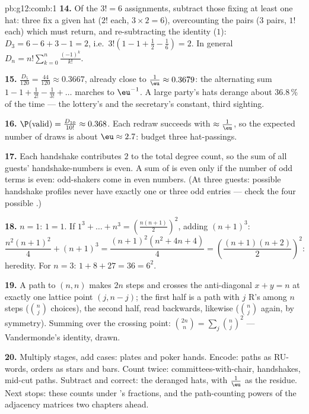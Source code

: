 \begin{solution}{pb:g12:comb:1}
\textbf{14.} Of the $3! = 6$ assignments, subtract those
fixing at least one hat: three fix a given hat ($2!$ each,
$3 \times 2 = 6$), overcounting the pairs ($3$ pairs, $1!$
each) which must return, and re-subtracting the identity
($1$): $D_3 = 6 - 6 + 3 - 1 = 2$, i.e.\
$3!\left(1 - 1 + \frac12 - \frac16\right) = 2$. In general
$D_n = n!\sum_{k=0}^{n} \frac{(-1)^k}{k!}$.

\textbf{15.} $\frac{D_5}{120} = \frac{44}{120} \approx
0.3667$, already close to $\frac1\eu \approx 0.3679$: the
alternating sum $1 - 1 + \frac{1}{2!} - \frac{1}{3!} + \dots$
marches to $\eu^{-1}$. A large party's hats derange about
$36.8\,\%$ of the time --- the lottery's and the secretary's
constant, third sighting.

\textbf{16.} $\P(\text{valid}) = \frac{D_{10}}{10!} \approx
0.368$. Each redraw succeeds with 
$\approx \frac1\eu$, so the expected number of draws is about
$\eu \approx 2.7$: budget three hat-passings.

\textbf{17.} Each handshake contributes $2$ to the total
degree count, so the sum of all guests' handshake-numbers is
even. A sum of  is even only if the number of odd
terms is even: odd-shakers come in even numbers. (At three
guests: possible handshake profiles never have exactly one or
three odd entries --- check the four possible .)

\textbf{18.} $n = 1$: $1 = 1$. If
$1^3 + \dots + n^3 = \left(\frac{n(n+1)}{2}\right)^2$, adding
$(n+1)^3$:
\[
\frac{n^2(n+1)^2}{4} + (n+1)^3
= \frac{(n+1)^2\left(n^2 + 4n + 4\right)}{4}
= \left(\frac{(n+1)(n+2)}{2}\right)^{\!2} :
\]
heredity. For $n = 3$: $1 + 8 + 27 = 36 = 6^2$.

\textbf{19.} A path to $(n, n)$ makes $2n$ steps and crosses
the anti-diagonal $x + y = n$ at exactly one lattice point
$(j, n - j)$; the first half is a path with $j$ R's among $n$
steps ($\binom nj$ choices), the second half, read backwards,
likewise ($\binom nj$ again, by symmetry). Summing over the
crossing point: $\binom{2n}{n} = \sum_j \binom nj^2$ ---
Vandermonde's identity, drawn.

\textbf{20.} Multiply stages, add cases: plates and poker
hands. Encode: paths as RU-words, orders as stars and bars.
Count twice: committees-with-chair, handshakes, mid-cut paths.
Subtract and correct: the deranged hats, with $\frac1\eu$ as
the residue. Next stops: these counts under 's
fractions, and the path-counting powers of the adjacency
matrices two chapters ahead.
\end{solution}
